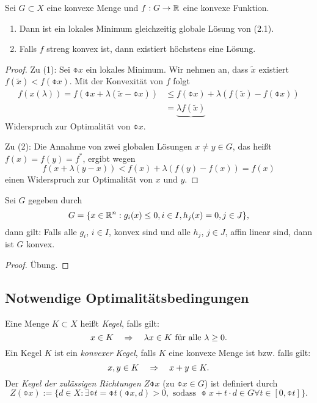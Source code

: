 \begin{thm}
  Sei $G \subset X$ eine konvexe Menge und $f: G \to \mathbb{R}$ eine konvexe
  Funktion.
  \begin{enumerate}[(1)]
  \item Dann ist ein lokales Minimum gleichzeitig globale Lösung von (2.1).
  \item Falls $f$ streng konvex ist, dann existiert höchstens eine Lösung.
  \end{enumerate}
\end{thm}

\begin{proof}
  Zu (1): Sei $\obar{x}$ ein lokales Minimum. Wir nehmen an, dass $\tilde{x}$
  existiert $f(\tilde{x}) < f(\obar{x})$. Mit der Konvexität von $f$ folgt
  \[ \begin{aligned}
      f( x(\lambda) ) = f( \obar{x} + \lambda(\tilde{x} - \obar{x}) )
      &\le f( \obar{x} ) + \lambda(f(\tilde{x}) - f(\obar{x})) \\
      &= \underbrace{\lambda f( \tilde{x} )}
    \end{aligned} \] %
  Widerspruch zur Optimalität von $\obar{x}$.

  Zu (2): Die Annahme von zwei globalen Lösungen $x \ne y \in G$, das heißt
  $f(x) = f(y) = f^*$, ergibt wegen
  \[ f(x + \lambda(y-x)) < f(x) + \lambda( f(y) - f(x) ) = f(x) \]
  einen Widerspruch zur Optimalität von $x$ und $y$.
\end{proof}

\begin{aus}
  Sei $G$ gegeben durch
  \[ G = \{ x \in \mathbb{R}^n : g_i(x) \le 0, i \in I, h_j(x) = 0, j \in J \}, \]
  dann gilt: Falls alle $g_i$, $i \in I$, konvex sind und alle $h_j$, $j \in J$,
  affin linear sind, dann ist $G$ konvex.
\end{aus}

\begin{proof}
  Übung.
\end{proof}

\subsection{Notwendige Optimalitätsbedingungen}
\begin{defn}
  Eine Menge $K \subset X$ heißt \emph{Kegel}, falls gilt:
  \[ x \in K \quad \Rightarrow \quad \lambda x \in K \text{ für alle } \lambda \ge 0. \]
  Ein Kegel $K$ ist ein \emph{konvexer Kegel}, falls $K$ eine konvexe Menge ist
  bzw. falls gilt:
  \[ x,y \in K \quad \Rightarrow \quad x + y \in K. \]
  Der \emph{Kegel der zulässigen Richtungen} $Z{\obar{x}}$ (zu $\obar{x} \in G$)
  ist definiert durch
  \[ Z(\obar{x}) := \{ d \in X : \exists \obar{t} = \obar{t}(\obar{x},d) > 0,
    \text{ sodass } \obar{x} + t \cdot d \in G \forall t \in [0,\obar{t}] \}. \]
\end{defn}

